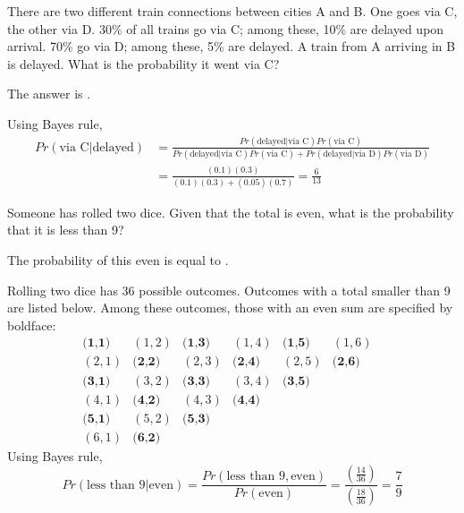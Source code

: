 \documentclass{ximera}
\begin{document}
\begin{question}
There are two different train connections between cities A and B.  One goes via C, the other via D.  30\% of all trains go via C; among these, 10\% are delayed upon arrival.  70\% go via D; among these, 5\% are delayed.   A train from A arriving in B is delayed.  What is the probability it went via C?
\begin{solution}
The answer is .
\end{solution}
Using Bayes rule,
\begin{align*}
Pr (\text{via C} | \text{delayed}) &= \frac{Pr(\text{delayed} | \text{via C}) Pr(\text{via C})}{Pr(\text{delayed} | \text{via C}) Pr(\text{via C}) + Pr(\text{delayed} | \text{via D}) Pr(\text{via D})} \\
& = \frac{(0.1)(0.3)}{(0.1)(0.3) + (0.05)(0.7)} = \frac{6}{13}
\end{align*}
\end{question}

\begin{question}
Someone has rolled two dice.  Given that the total is even, what is the probability that it is less than 9?
\begin{solution}
The probability of this even is equal to .
\end{solution}
Rolling two dice has 36 possible outcomes. Outcomes with a total smaller than 9 are listed below. Among these outcomes, those with an even sum are specified by boldface:
\begin{equation*}
\begin{matrix}
\textbf{(1,1)} & (1,2) & \textbf{(1,3)} & (1,4) & \textbf{(1,5)} & (1,6) \\
(2,1) & \textbf{(2,2)} & (2,3) & \textbf{(2,4)} & (2,5) & \textbf{(2,6)} \\
\textbf{(3,1)} & (3,2) & \textbf{(3,3)} & (3,4) & \textbf{(3,5)} && \\
(4,1) & \textbf{(4,2)} & (4,3) & \textbf{(4,4)} &&& \\
\textbf{(5,1)} & (5,2) & \textbf{(5,3)} &&&& \\
(6,1) & \textbf{(6,2)}
\end{matrix}
\end{equation*}
Using Bayes rule,
\begin{equation*}
Pr (\text{less than 9} | \text{even}) = \frac{Pr(\text{less than 9}, \text{even})}{Pr(\text{even})} = \frac{(\frac{14}{36})}{(\frac{18}{36})} = \frac{7}{9}
\end{equation*}
\end{question}
\end{document}
